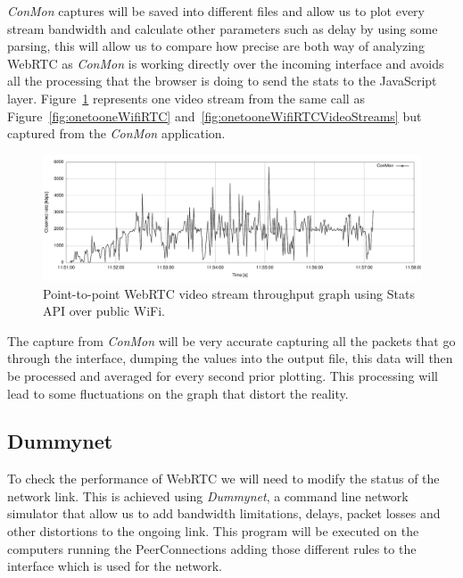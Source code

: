 {\it ConMon} captures will be saved into different files and allow us to plot every stream bandwidth and calculate other parameters such as delay by using some parsing, this will allow us to compare how precise are both way of analyzing WebRTC as {\it ConMon} is working directly over the incoming interface and avoids all the processing that the browser is doing to send the stats to the JavaScript layer. Figure~\ref{fig:onetooneWifiRTCConMon} represents one video stream from the same call as Figure~\ref{fig:onetooneWifiRTC} and~\ref{fig:onetooneWifiRTCVideoStreams} but captured from the {\it ConMon} application.

 \begin{figure}[h]
  \centering
    \includegraphics[width=1\textwidth]{./figures/onetooneWiFiConMon.pdf}
      \caption[Point-to-point WebRTC video stream throughput graph using Stats API over public WiFi]{Point-to-point WebRTC video stream throughput graph using Stats API over public WiFi.}
	\label{fig:onetooneWifiRTCConMon}
\end{figure}

The capture from {\it ConMon} will be very accurate capturing all the packets that go through the interface, dumping the values into the output file, this data will then be processed and averaged for every second prior plotting. This processing will lead to some fluctuations on the graph that distort the reality.

\subsection{Dummynet}

To check the performance of WebRTC we will need to modify the status of the network link. This is achieved using {\it Dummynet}, a command line network simulator that allow us to add bandwidth limitations, delays, packet losses and other distortions to the ongoing link. This program will be executed on the computers running the PeerConnections adding those different rules to the interface which is used for the network.

